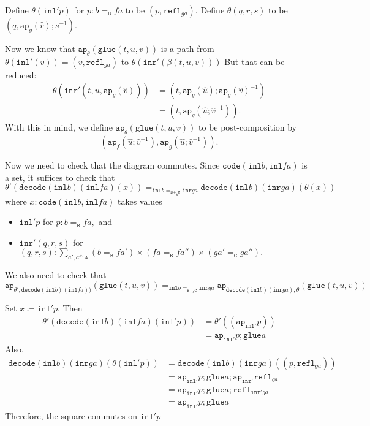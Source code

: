 \documentclass[12pt]{amsart}
\newcommand{\bydef}{\coloneqq}
\newcommand{\type}[1]{\mathtt{#1}}
\newcommand{\tin}{\colon}
\newcommand{\A}{\type{A}}
\newcommand{\B}{\type{B}}
\newcommand{\C}{\type{C}}
\newcommand{\BAC}{\B +_{\A} \C}
\newcommand{\ap}{\type{ap}}
\newcommand{\inl}{\type{inl}}
\newcommand{\inr}{\type{inr}}
\newcommand{\glue}{\type{glue}}
\newcommand{\refl}{\type{refl}}
\newcommand{\code}{\type{code}}
\newcommand{\decode}{\type{decode}}
\theoremstyle{remark}
\theoremstyle{definition}
\begin{document}
Define
\(
  \theta (\inl' p)
\)
for
\(
  p \tin b=_\B fa
\)
to be
\(
  ( p , \refl_{ga} ).
\)
Define
\(
  \theta ( q,r,s )
\)
to be
\(
  ( q , \ap_g ( \hat{r} ) ; s^{-1} ).
\)

Now we know that
\(
  \ap_{ \theta } ( \glue ( t,u,v ) )
\)
is a path from
\(
  \theta ( \inl' ( v ) ) = ( v , \refl_{ga} )
\)
to
\(
  \theta ( \inr' ( \beta ( t,u,v ) ) )
\)
But that can be reduced:
%
\begin{align*}
  \theta ( \inr' ( t,u,\ap_{g}(\hat{v}) ) )
  & = ( t, \ap_g ( \hat{u} ); \ap_g ( \hat{v} )^{-1} ) \\
  & = ( t, \ap_g ( \hat{u} ; \hat{v}^{-1}) ).
\end{align*}
% 
With this in mind, we define
\(
  \ap_{\theta} ( \glue ( t,u,v ) )
\)
to be post-composition by
\[
  ( \ap_f ( \hat{u};\hat{v}^{-1} ) , \ap_g ( \hat{u};\hat{v}^{-1} ) ).
\]

Now we need to check that the diagram commutes.  Since
\(
  \code ( \inl b , \inl fa )
\)
is a set, it suffices to check that
\[
  \theta' ( \decode (\inl b ) ( \inl fa ) ( x ) )
    =_{ \inl b =_{\BAC} \inr ga }
    \decode ( \inl b )(\inr ga) ( \theta ( x ) )
\]
where
\(
  x \tin \code ( \inl b, \inl fa )
\)
takes values
%
\begin{itemize}
\item
  \(
    \inl' p
  \)
  for
  \(
    p \tin b=_\B fa,
  \)
  and
\item
  \(
    \inr' ( q,r,s )
  \)
  for
  \(
    ( q,r,s ) \tin
      \sum\limits_{a',a'' \tin \A}
      (b=_\B fa') \times ( fa =_\B fa'' )\times ( ga'=_\C ga'' ).
  \)
\end{itemize}
%
We also need to check that
\[
  \ap_{ \theta' ; \decode ( \inl b ) ( \inl fa ) )} ( \glue ( t,u,v ) ) 
    =_{ \inl b =_{\BAC} \inr ga }
    \ap_{ \decode ( \inl b )(\inr ga) ; \theta } ( \glue ( t,u,v ) ) 
\]

Set
\(
  x \bydef \inl' p.
\)
Then
%
\begin{align*}
  \theta' ( \decode ( \inl b ) ( \inl fa ) ( \inl' p ) )
  & = \theta' ( ( \ap_{\inl'} p ) ) \\
  & = \ap_{\inl'} p ; \glue a
\end{align*}
%
Also,
%
\begin{align*}
  \decode ( \inl b ) ( \inr ga ) ( \theta ( \inl' p ) )
  & = \decode ( \inl b ) ( \inr ga ) ( ( p,\refl_{ga} ) ) \\
  & = \ap_{\inl'} p ; \glue a ; \ap_{\inr'} \refl_{ga} \\
  & = \ap_{\inl'} p ; \glue a ; \refl_{\inr' ga} \\
  & = \ap_{\inl'} p ; \glue a
\end{align*}
%
Therefore, the square commutes on \( \inl' p \)
\end{document}
